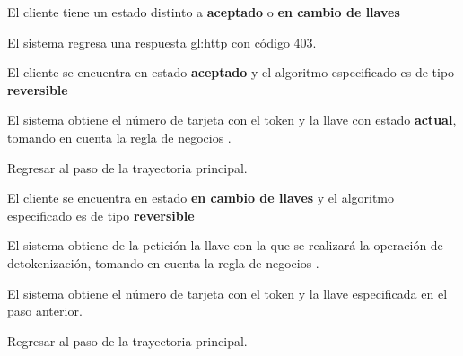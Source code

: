 {  %

  \begin{trayectoriaAlternativa}
    {El cliente tiene un estado distinto a \textbf{aceptado} o
      \textbf{en cambio de llaves}}

    \item El sistema regresa una respuesta \gls{gl:http} con código 403.

  \end{trayectoriaAlternativa}


  \begin{trayectoriaAlternativa}
    {El cliente se encuentra en estado \textbf{aceptado} y el algoritmo
    especificado es de tipo \textbf{reversible}}

    \item El sistema obtiene el número de tarjeta con el token y la llave
      con estado \textbf{actual}, tomando en cuenta la regla de negocios
      .

    \item Regresar al paso  de la trayectoria
      principal.

  \end{trayectoriaAlternativa}


  \begin{trayectoriaAlternativa}
    {El cliente se encuentra en estado \textbf{en cambio de llaves} y el
    algoritmo especificado es de tipo \textbf{reversible}}

    \item El sistema obtiene de la petición la llave con la que se realizará
      la operación de detokenización, tomando en cuenta la regla de negocios
      .

    \item El sistema obtiene el número de tarjeta con el token y la llave
      especificada en el paso anterior.

    \item Regresar al paso  de la trayectoria
      principal.


\end{trayectoriaAlternativa}}
